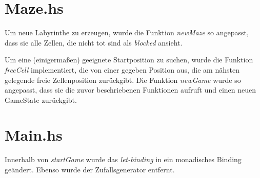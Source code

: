 \documentclass{rp}
\begin{document}
\section*{Maze.hs}
Um neue Labyrinthe zu erzeugen, wurde die Funktion \textit{newMaze} so angepasst, dass sie alle Zellen, die nicht tot sind als \textit{blocked} ansieht. 

Um eine (einigermaßen) geeignete Startposition zu suchen, wurde die Funktion \textit{freeCell} implementiert, die von einer gegeben Position aus, die am nähsten gelegende freie Zellenposition zurückgibt. 
\newpage
Die Funktion \textit{newGame} wurde so angepasst, dass sie die zuvor beschriebenen Funktionen aufruft und einen neuen GameState zurückgibt.

\section*{Main.hs}
Innerhalb von \textit{startGame} wurde das \textit{let-binding} in ein monadisches Binding geändert. Ebenso wurde der Zufallsgenerator entfernt. 

\end{document}
